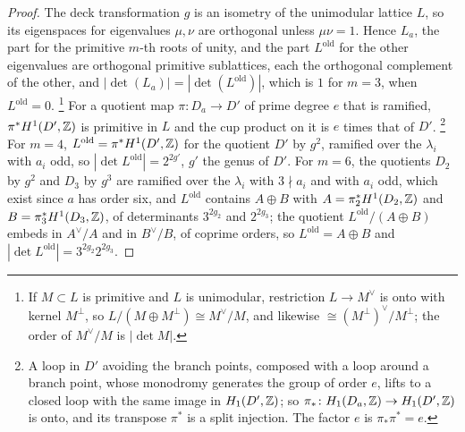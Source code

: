 \begin{proof}
The deck transformation $g$ is an isometry of the unimodular lattice $L$, so
its eigenspaces for eigenvalues $\mu,\nu$ are orthogonal unless $\mu\nu=1$.
Hence $L_{a}$, the part for the primitive $m$-th roots of unity, and the
part $L^{\mathrm{old}}$ for the other eigenvalues are orthogonal primitive
sublattices, each the orthogonal complement of the other, and
$|\det(L_{a})|=|\det(L^{\mathrm{old}})|$, which is $1$ for $m=3$, when
$L^{\mathrm{old}}=0$.%
\footnote{If $M\subset L$ is primitive and $L$ is unimodular, restriction
$L\to M^{\vee}$ is onto with kernel $M^{\perp}$, so $L/(M\oplus M^{\perp})\cong
M^{\vee}/M$, and likewise $\cong(M^{\perp})^{\vee}/M^{\perp}$; the order of
$M^{\vee}/M$ is $|\det M|$.} For a quotient map $\pi\colon D_{a}\to D'$ of
prime degree $e$ that is ramified, $\pi^{*}H^{1}(D',\mathbb{Z})$ is primitive in $L$
and the cup product on it is $e$ times that of $D'$.%
\footnote{A loop in $D'$ avoiding the branch points, composed with a loop
around a branch point, whose monodromy generates the group of order $e$,
lifts to a closed loop with the same image in $H_{1}(D',\mathbb{Z})$; so
$\pi_{*}\colon H_{1}(D_{a},\mathbb{Z})\to H_{1}(D',\mathbb{Z})$ is onto, and its transpose
$\pi^{*}$ is a split injection. The factor $e$ is $\pi_{*}\pi^{*}=e$.} For
$m=4$, $L^{\mathrm{old}}=\pi^{*}H^{1}(D',\mathbb{Z})$ for the quotient $D'$ by $g^{2}$,
ramified over the $\lambda_{i}$ with $a_{i}$ odd, so
$|\det L^{\mathrm{old}}|=2^{2g'}$, $g'$ the genus of $D'$. For $m=6$, the
quotients $D_{2}$ by $g^{2}$ and $D_{3}$ by $g^{3}$ are ramified over the
$\lambda_{i}$ with $3\nmid a_{i}$ and with $a_{i}$ odd, which exist since $a$
has order six, and $L^{\mathrm{old}}$ contains $A\oplus B$ with
$A=\pi_{2}^{*}H^{1}(D_{2},\mathbb{Z})$ and $B=\pi_{3}^{*}H^{1}(D_{3},\mathbb{Z})$, of determinants
$3^{2g_{2}}$ and $2^{2g_{3}}$; the quotient $L^{\mathrm{old}}/(A\oplus B)$ embeds in
$A^{\vee}/A$ and in $B^{\vee}/B$, of coprime orders, so $L^{\mathrm{old}}=A\oplus B$
and $|\det L^{\mathrm{old}}|=3^{2g_{2}}2^{2g_{3}}$.


\end{proof}
